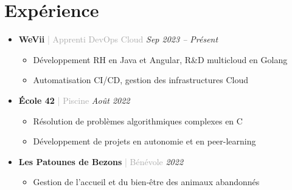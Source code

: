 \section{\icon{\faBriefcase} Expérience}
\begin{itemize}
    \item {\textbf{\color{mainblue}WeVii} \textcolor{darkgray}{| Apprenti DevOps Cloud}} \hfill \textit{Sep 2023 -- Présent}
    \begin{itemize}
        \item Développement RH en Java et Angular, R\&D multicloud en Golang
        \item Automatisation CI/CD, gestion des infrastructures Cloud
    \end{itemize}

    \item {\textbf{\color{mainblue}École 42} \textcolor{darkgray}{| Piscine}} \hfill \textit{Août 2022}
    \begin{itemize}
        \item Résolution de problèmes algorithmiques complexes en C
        \item Développement de projets en autonomie et en peer-learning
    \end{itemize}

    \item {\textbf{\color{mainblue}Les Patounes de Bezons} \textcolor{darkgray}{| Bénévole}} \hfill \textit{2022}
    \begin{itemize}
        \item Gestion de l'accueil et du bien-être des animaux abandonnés
    \end{itemize}
\end{itemize}